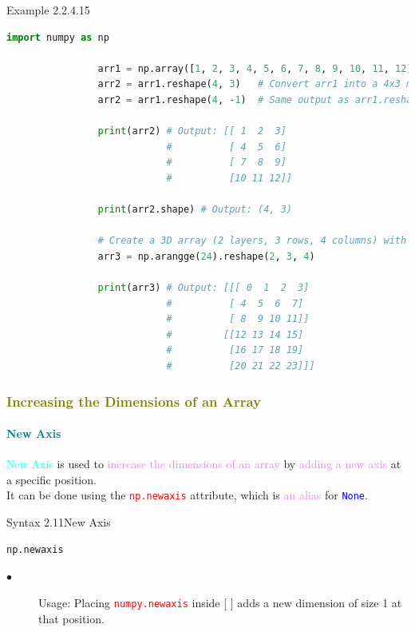 \documentclass{book}
\begin{document}
\begin{egBox}{Example 2.2.4.15}{}
    \begin{lstlisting}[language=Python, basicstyle=\ttfamily\small, keywordstyle=\color{blue}, commentstyle=\color{forestgreen}, stringstyle=\color{red}, showstringspaces=false]
                import numpy as np

                arr1 = np.array([1, 2, 3, 4, 5, 6, 7, 8, 9, 10, 11, 12])
                arr2 = arr1.reshape(4, 3)   # Convert arr1 into a 4x3 matrix
                arr2 = arr1.reshape(4, -1)  # Same output as arr1.reshape(4, 3)

                print(arr2) # Output: [[ 1  2  3]
                            #          [ 4  5  6]
                            #          [ 7  8  9]
                            #          [10 11 12]]

                print(arr2.shape) # Output: (4, 3)

                # Create a 3D array (2 layers, 3 rows, 4 columns) with numbers 0 to 23
                arr3 = np.arangge(24).reshape(2, 3, 4)

                print(arr3) # Output: [[[ 0  1  2  3]
                            #          [ 4  5  6  7]
                            #          [ 8  9 10 11]]
                            #         [[12 13 14 15]
                            #          [16 17 18 19]
                            #          [20 21 22 23]]]
    \end{lstlisting}
\end{egBox}
\textcolor{olive}{\subsubsection{Increasing the Dimensions of an Array}}
\textcolor{teal}{\paragraph{New Axis}}
\textcolor{cyan}{New Axis} is used to \textcolor{violet}{increase the dimensions of an array} by \textcolor{violet}{adding a new axis} at a specific position.\\
It can be done using the \textcolor{red}{\texttt{np.newaxis}} attribute, which is \textcolor{violet}{an alias} for \textcolor{blue}{\texttt{None}}.
\begin{synBox}{Syntax 2.11}{New Axis}
    \begin{lstlisting}[language=Python, basicstyle=\ttfamily\small, keywordstyle=\color{blue}, commentstyle=\color{forestgreen}, stringstyle=\color{red}, showstringspaces=false]
                                            np.newaxis
    \end{lstlisting}
    \raggedright
    \begin{description}
        \item[$\bullet$] Usage: Placing \textcolor{red}{\texttt{numpy.newaxis}} inside [ ] adds a new dimension of size 1 at that position.
    \end{description}
\end{synBox}
\end{document}
